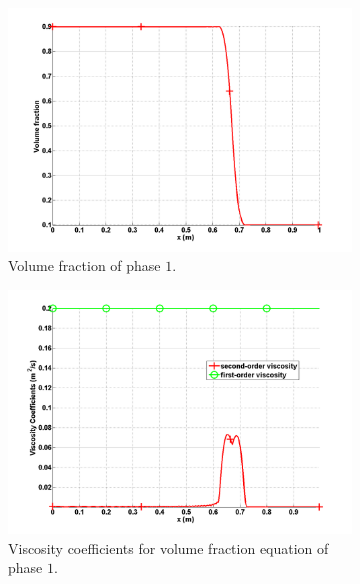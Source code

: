 \begin{figure}[H]
        \centering
        \begin{subfigure}[b]{0.495\textwidth}
                \centering
                \includegraphics[width=\textwidth]{figures/SEM/liquid_volume_fraction.png}
                \caption{Volume fraction of phase $1$.}
                \label{fig:vf-liq-7-eqn-sect4}
        \end{subfigure}%
        \begin{subfigure}[b]{0.495\textwidth}
                \centering
                \includegraphics[width=\textwidth]{figures/SEM/liquid_beta.png}
                \caption{Viscosity coefficients for volume fraction equation of phase $1$.}
                \label{fig:beta-liq-7-eqn-sect4}
        \end{subfigure}
        \caption{\label{fig:beta-visc-7-sect4}}
\end{figure}
